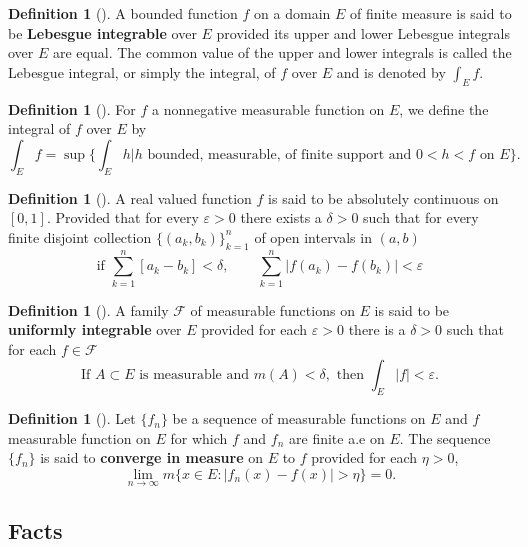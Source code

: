 \documentclass[	DIV=calc,paper=a4,fontsize=11pt]{scrartcl}	 	%
\theoremstyle{definition}
\newtheorem{defn}[thm]{Definition}
\theoremstyle{plain}
\theoremstyle{remark}
\begin{document}
\begin{defn}[\textbf{\color{blue}{Lebesgue Integrable}}]
A bounded function $f$ on a domain $E$ of finite measure is said to be \textbf{Lebesgue integrable} over $E$ provided its upper and lower Lebesgue integrals over $E$ are equal. The common value of the upper and lower integrals is called the Lebesgue integral, or simply the integral, of $f$ over $E$ and is denoted by $\int_E f$.
\end{defn}
\begin{defn}[\textbf{\color{blue}{Lebesgue Integral of non negative function}}]
For $f$ a nonnegative measurable function on $E$, we define the integral of $f$ over $E$ by
\[\int_E f = \sup \biggl\{\int_E h | h \text{ bounded, measurable, of finite support and } 0 < h < f \text{ on } E\biggl\}.\]
\end{defn}
\begin{defn}[\textbf{\color{blue}{Absolute Continuous}}]
A real valued function $f$ is said to be absolutely continuous on $[0,1]$. Provided that for every $\varepsilon>0$ there exists a $\delta>0$ such that for every finite disjoint collection $\{(a_k,b_k)\}_{k=1}^{n}$ of open intervals in $(a,b)$
\[\text{if }\sum_{k=1}^{n}[a_k-b_k]<\delta,\qquad \sum_{k=1}^{n}|f(a_k)-f(b_k)|<\varepsilon\]
\end{defn}

\begin{defn}[\textbf{\color{blue}{Uniformly Integrable}}]
A family $\mathcal{F}$ of measurable functions on $E$ is said to be \textbf{uniformly integrable} over $E$ provided for each $\varepsilon>0$ there is a $\delta>0$ such that for each $f\in \mathcal{F}$
\[\text{If } A\subset E \text{ is measurable and } m(A)<\delta,\text{ then } \int_E|f|<\varepsilon.\]
\end{defn}

\begin{defn}[\textbf{\color{blue}{Convergence in measure}}]
Let $\{f_n\}$ be a sequence of measurable functions on $E$ and $f$ measurable function on $E$ for which $f$ and $f_n$ are finite a.e on $E$. The sequence $\{f_n\}$ is said to \textbf{converge in measure} on $E$ to $f$ provided for each $\eta> 0$,
\[\lim_{n\to\infty} m\{x\in E:|f_n(x)-f(x)|>\eta\}=0.\]
\end{defn}


\subsection{Facts}
\end{document}
